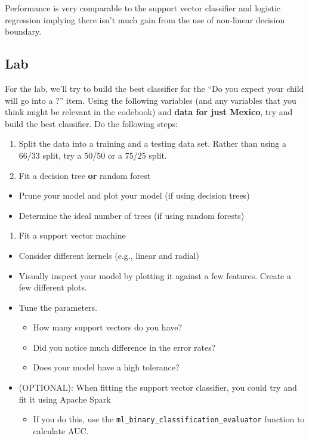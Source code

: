 \documentclass[]{book}
\providecommand{\tightlist}{%
  \setlength{\itemsep}{0pt}\setlength{\parskip}{0pt}}
\begin{document}
Performance is very comparable to the support vector classifier and logistic regression implying there isn't much gain from the use of non-linear decision boundary.

\hypertarget{lab-2}{%
\subsection{Lab}\label{lab-2}}

For the lab, we'll try to build the best classifier for the ``Do you expect your child will go into a ?'' item. Using the following variables (and any variables that you think might be relevant in the codebook) and \textbf{data for just Mexico}, try and build the best classifier. Do the following steps:

\begin{enumerate}
\def\labelenumi{\arabic{enumi}.}
\item
  Split the data into a training and a testing data set. Rather than using a 66/33 split, try a 50/50 or a 75/25 split.
\item
  Fit a decision tree \textbf{or} random forest
\end{enumerate}

\begin{itemize}
\tightlist
\item
  Prune your model and plot your model (if using decision trees)
\item
  Determine the ideal number of trees (if using random forests)
\end{itemize}

\begin{enumerate}
\def\labelenumi{\arabic{enumi}.}
\setcounter{enumi}{2}
\tightlist
\item
  Fit a support vector machine
\end{enumerate}

\begin{itemize}
\tightlist
\item
  Consider different kernels (e.g., linear and radial)
\item
  Visually inspect your model by plotting it against a few features. Create a few different plots.
\item
  Tune the parameters.

  \begin{itemize}
  \tightlist
  \item
    How many support vectors do you have?
  \item
    Did you notice much difference in the error rates?
  \item
    Does your model have a high tolerance?
  \end{itemize}
\item
  (OPTIONAL): When fitting the support vector classifier, you could try and fit it using Apache Spark

  \begin{itemize}
  \tightlist
  \item
    If you do this, use the \texttt{ml\_binary\_classification\_evaluator} function to calculate AUC.
  \end{itemize}
\end{itemize}
\end{document}

